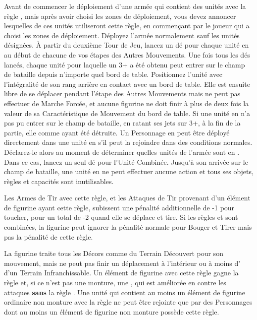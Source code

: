 Avant de commencer le déploiement d'une armée qui contient des unités avec la règle \ambush{}, mais après avoir choisi les zones de déploiement, vous devez annoncer lesquelles de ces unités utiliseront cette règle, en commençant par le joueur qui a choisi les zones de déploiement. Déployez l'armée normalement sauf les unités désignées. À partir du deuxième Tour de Jeu, lancez un dé pour chaque unité en \ambush{} au début de chacune de vos étapes des Autres Mouvements. Une fois tous les dés lancés, chaque unité pour laquelle un 3+ a été obtenu peut entrer sur le champ de bataille depuis n'importe quel bord de table. Positionnez l'unité avec l'intégralité de son rang arrière en contact avec un bord de table. Elle est ensuite libre de se déplacer pendant l'étape des Autres Mouvements mais ne peut pas effectuer de Marche Forcée, et aucune figurine ne doit finir à plus de deux fois la valeur de sa Caractéristique de Mouvement du bord de table. Si une unité en \ambush{} n'a pas pu entrer sur le champ de bataille, en ratant ses jets sur 3+, à la fin de la partie, elle comme ayant été détruite. Un Personnage en \ambush{} peut être déployé directement dans une unité en \ambush{} s'il peut la rejoindre dans des conditions normales. Déclarez-le alors au moment de déterminer quelles unités de l'armée sont en \ambush{}. Dans ce cas, lancez un seul dé pour l'Unité Combinée. Jusqu'à son arrivée sur le champ de bataille, une unité en \ambush{} ne peut effectuer aucune action et tous ses objets, règles et capacités sont inutilisables.


Les Armes de Tir avec cette règle, et les Attaques de Tir provenant d'un élément de figurine ayant cette règle, subissent une pénalité additionnelle de -1 pour toucher, pour un total de -2 quand elle se déplace et tire. Si les règles \unwieldy{} et \quicktofire{} sont combinées, la figurine peut ignorer la pénalité normale pour Bouger et Tirer mais pas la pénalité de cette règle.


La figurine traite tous les Décors comme du Terrain Découvert pour son mouvement, mais ne peut pas finir un déplacement à l'intérieur ou à moins d' d'un Terrain Infranchissable. Un élément de figurine avec cette règle gagne la règle \magicalattacks{} et, si ce n'est pas une monture, une , qui est améliorée en  contre les attaques \textbf{sans} la règle \magicalattacks{}. Une unité qui contient au moins un élément de figurine ordinaire non monture avec la règle \ethereal{} ne peut être rejointe que par des Personnages dont au moins un élément de figurine non monture possède cette règle.


